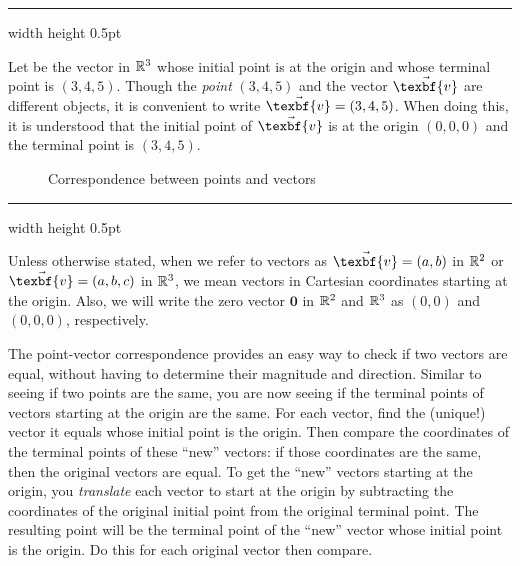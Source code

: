 \vspace{4mm}
\hrule width \textwidth height 0.5pt
\begin{exmp}
 Let  be the vector in $\mathbb{R}^{3}$ whose initial point is at the origin and whose terminal point
 is $(3,4,5)$.  Though the \emph{point} $(3,4,5)$ and the vector $\vec{\texbf{v}}$ are different objects, it is
 convenient to write $\vec{\texbf{v}} = (3,4,5)$.  When doing this, it is understood that the initial point of $\vec{\texbf{v}}$
 is at the origin $(0,0,0)$ and the terminal point is $(3,4,5)$.
\end{exmp}

\begin{figure}[h]
 \centering
 \qquad\qquad
 \caption[]{\quad Correspondence between points and vectors}
 \label{fig:corresp}
\end{figure}
\hrule width \textwidth height 0.5pt
\vspace{4mm}

Unless otherwise stated, when we refer to vectors as $\vec{\texbf{v}} = (a,b)$ in $\mathbb{R}^{2}$ or $\vec{\texbf{v}} = (a,b,c)$
in $\mathbb{R}^{3}$, we mean vectors in Cartesian coordinates starting at the origin.  Also, we will write
the zero vector $\textbf{0}$ in $\mathbb{R}^{2}$ and $\mathbb{R}^{3}$ as $(0,0)$ and $(0,0,0)$, respectively.

The point-vector correspondence provides an easy way to check if two vectors are
equal, without having to determine their magnitude and direction.  Similar to seeing if two points are the same, you are
now seeing if the terminal points of vectors starting at the origin are the same.  For each vector, find the
(unique!) vector it equals whose initial point is the origin.  Then compare the coordinates of the terminal points of
these ``new'' vectors: if those coordinates are the same, then the original vectors are equal.  To get the ``new''
vectors starting at the origin, you \emph{translate}
each vector to start at the origin by subtracting the coordinates of the original
initial point from the original terminal point.  The resulting point will be the terminal point of
the ``new'' vector whose initial point is the origin.  Do this for each original vector then compare.

